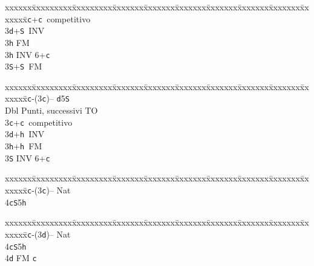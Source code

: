\documentclass[a4paper,italian]{article}
\newcommand{\BS}{\small{\texttt{S}}}
\newcommand{\BC}{\small{\texttt{c}}}
\newcommand{\BD}{\small{\texttt{d}}}
\newcommand{\BH}{\small{\texttt{h}}}
\newenvironment{bidtable}
{\begin{tabbing}

    xxxxxx\=xxxxxxxxx\=xxxxxxxxx\=xxxxxxx\=xxxxxxx\=xxxxxxx\=xxxxxxx\=xxxxxxx\=xxxxxxx\=xxxxxxx\=\kill}
{\end{tabbing} }%
\begin{document}
\begin{multicols}{2}
\begin{bidtable}
        3\BC {}+\BC\ competitivo\\
        3\BD {}+\BS\ INV\+\\
        3\BH \> FM\-\\
        3\BH \> INV 6+\BC \\
        3\BS {}+\BS\ FM\-
    \end{bidtable}
    \begin{bidtable}
        1\BC-(3\BC)-- \> \BD 5\BS \+\\
        Dbl \> Punti, successivi TO\\
        3\BC {}+\BC\ competitivo\\
        3\BD {}+\BH\ INV\\
        3\BH {}+\BH\ FM\\
        3\BS \> INV 6+\BC \-
    \end{bidtable}
    \begin{bidtable}
        1\BC-(3\BC)-- \> \> Nat\+\\
        4\BC {}\BS 5\BH \-
    \end{bidtable}
    \begin{bidtable}
        1\BC-(3\BD)-- \> \> Nat\+\\
        4\BC {}\BS 5\BH \\
        4\BD \> FM \BC \-
    \end{bidtable}


\end{multicols}
\end{document}

